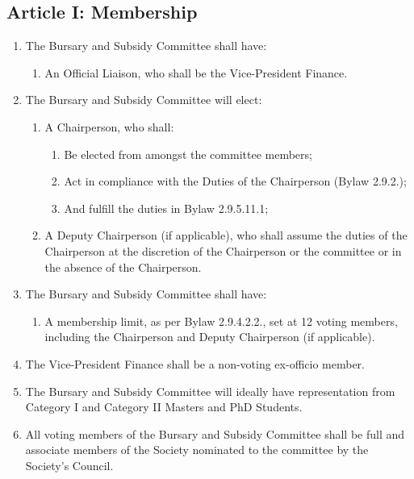 \subsection{Article I: Membership}
\begin{enumerate}[label*=\arabic*., align=left]	
\item The Bursary and Subsidy Committee shall have:
\begin{enumerate}[label*=\arabic*., align=left]	
\item An Official Liaison, who shall be the Vice-President Finance.
\end{enumerate}
\item The Bursary and Subsidy Committee will elect:
\begin{enumerate}[label*=\arabic*., align=left]
\item A Chairperson, who shall:
\begin{enumerate}[label*=\arabic*., align=left]
\item Be elected from amongst the committee members;
\item Act in compliance with the Duties of the Chairperson (Bylaw 2.9.2.);
\item And fulfill the duties in Bylaw 2.9.5.11.1;
\end{enumerate}
\item A Deputy Chairperson (if applicable), who shall assume the duties of the Chairperson at the discretion of the Chairperson or the committee or in the absence of the Chairperson.
\end{enumerate}
\item The Bursary and Subsidy Committee shall have:
\begin{enumerate}[label*=\arabic*., align=left]
\item A membership limit, as per Bylaw 2.9.4.2.2., set at 12 voting members, including the Chairperson and Deputy Chairperson (if applicable).
\end{enumerate}
\item The Vice-President Finance shall be a non-voting ex-officio member.
\item The Bursary and Subsidy Committee will ideally have representation from Category I and Category II Masters and PhD Students.
\item All voting members of the Bursary and Subsidy Committee shall be full and associate members of the Society nominated to the committee by the Society’s Council.     
\end{enumerate}

